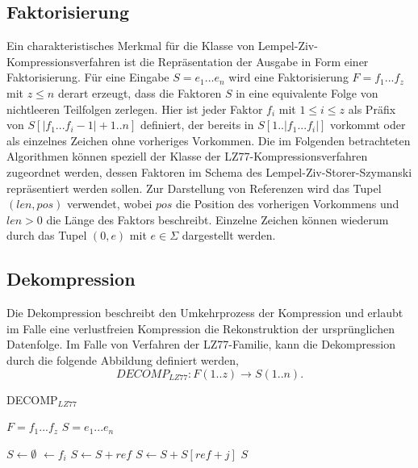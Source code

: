 \subsection{Faktorisierung}
Ein charakteristisches Merkmal für die Klasse von Lempel-Ziv-Kompressionsverfahren ist die Repräsentation der Ausgabe in Form einer Faktorisierung. Für eine Eingabe $S=e_1...e_n$ 
wird eine Faktorisierung $F=f_1...f_z$ mit $z\leq n$ derart erzeugt, dass die Faktoren $S$ in eine equivalente Folge von nichtleeren Teilfolgen zerlegen. Hier ist jeder Faktor
$f_i$ mit $1\leq i\leq z$ als Präfix von $S[|f_1...f_i-1|+1..n]$ definiert, der bereits in $S[1..|f_1...f_i|]$ vorkommt oder als einzelnes Zeichen ohne vorheriges Vorkommen. Die im 
Folgenden betrachteten Algorithmen können speziell der Klasse der LZ77-Kompressionsverfahren zugeordnet werden, dessen Faktoren im Schema des Lempel-Ziv-Storer-Szymanski repräsentiert
werden sollen. Zur Darstellung von Referenzen wird das Tupel $(len, pos)$ verwendet, wobei $pos$ die Position des vorherigen Vorkommens und $len>0$ die Länge des Faktors beschreibt. 
Einzelne Zeichen können wiederum durch das Tupel $(0, e)$ mit $e\in \Sigma$ dargestellt werden.

\subsection{Dekompression}
Die Dekompression beschreibt den Umkehrprozess der Kompression und erlaubt im Falle eine verlustfreien Kompression die Rekonstruktion der ursprünglichen Datenfolge. Im Falle von 
Verfahren der LZ77-Familie, kann die Dekompression durch die folgende Abbildung definiert werden, 
\begin{equation}
    DECOMP_{LZ77}: F(1..z) \rightarrow S(1..n).
\end{equation}

\begin{algorithm}
\centering
\caption{DECOMP$_{LZ77}$} \label{alg:decomp}
\algorithmicrequire $F=f_1...f_z$
\algorithmicensure $S=e_1...e_n$
\begin{algorithmic}
    \STATE $S \gets \emptyset$
         $\gets f_i$
            \STATE $S \gets S + ref$
        \ELSE
                \STATE $S \gets S + S[ref + j]$
            \ENDFOR
        \ENDIF
    \ENDFOR
    \RETURN $S$
\end{algorithmic}
\end{algorithm}

